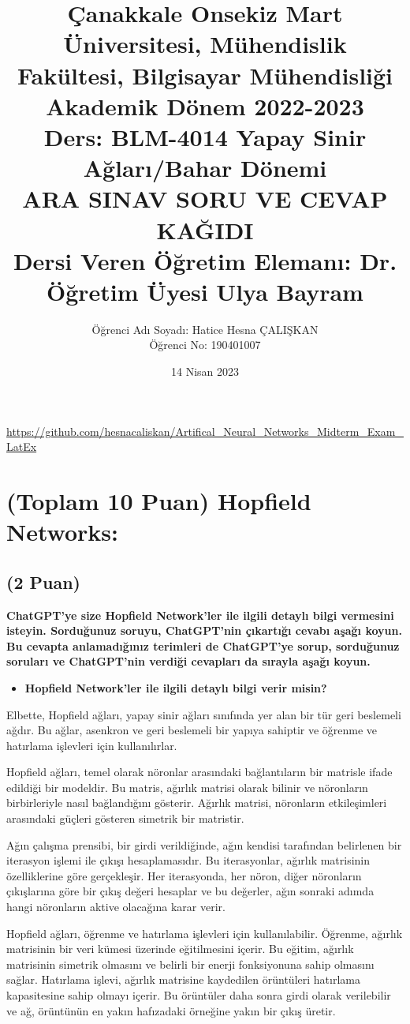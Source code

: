 \documentclass[11pt]{article}
\title{Çanakkale Onsekiz Mart Üniversitesi, Mühendislik Fakültesi, Bilgisayar Mühendisliği Akademik Dönem 2022-2023\\
Ders: BLM-4014 Yapay Sinir Ağları/Bahar Dönemi\\ 
ARA SINAV SORU VE CEVAP KAĞIDI\\
Dersi Veren Öğretim Elemanı: Dr. Öğretim Üyesi Ulya Bayram}
\author{%
\begin{minipage}{\textwidth}
\raggedright
Öğrenci Adı Soyadı: Hatice Hesna ÇALIŞKAN\\ %
Öğrenci No: 190401007
\end{minipage}%
}
\date{14 Nisan 2023}
\begin{document}
\maketitle

\url{https://github.com/hesnacaliskan/Artifical_Neural_Networks_Midterm_Exam_LatEx}

\section{(Toplam 10 Puan) Hopfield Networks:}

\subsection{(2 Puan)} \textbf{ChatGPT’ye size Hopfield Network’ler ile ilgili detaylı bilgi vermesini isteyin. Sorduğunuz soruyu, ChatGPT'nin çıkartığı cevabı aşağı koyun. Bu cevapta anlamadığınız terimleri de ChatGPT’ye sorup, sorduğunuz soruları ve ChatGPT’nin verdiği cevapları da sırayla aşağı koyun.}
 
\begin{itemize}
    \item \textbf{Hopfield Network’ler ile ilgili detaylı bilgi verir misin?}
\end{itemize}

Elbette, Hopfield ağları, yapay sinir ağları sınıfında yer alan bir tür geri beslemeli ağdır. Bu ağlar, asenkron ve geri beslemeli bir yapıya sahiptir ve öğrenme ve hatırlama işlevleri için kullanılırlar.

Hopfield ağları, temel olarak nöronlar arasındaki bağlantıların bir matrisle ifade edildiği bir modeldir. Bu matris, ağırlık matrisi olarak bilinir ve nöronların birbirleriyle nasıl bağlandığını gösterir. Ağırlık matrisi, nöronların etkileşimleri arasındaki güçleri gösteren simetrik bir matristir.

Ağın çalışma prensibi, bir girdi verildiğinde, ağın kendisi tarafından belirlenen bir iterasyon işlemi ile çıkışı hesaplamasıdır. Bu iterasyonlar, ağırlık matrisinin özelliklerine göre gerçekleşir. Her iterasyonda, her nöron, diğer nöronların çıkışlarına göre bir çıkış değeri hesaplar ve bu değerler, ağın sonraki adımda hangi nöronların aktive olacağına karar verir.

Hopfield ağları, öğrenme ve hatırlama işlevleri için kullanılabilir. Öğrenme, ağırlık matrisinin bir veri kümesi üzerinde eğitilmesini içerir. Bu eğitim, ağırlık matrisinin simetrik olmasını ve belirli bir enerji fonksiyonuna sahip olmasını sağlar. Hatırlama işlevi, ağırlık matrisine kaydedilen örüntüleri hatırlama kapasitesine sahip olmayı içerir. Bu örüntüler daha sonra girdi olarak verilebilir ve ağ, örüntünün en yakın hafızadaki örneğine yakın bir çıkış üretir.
\end{document}

